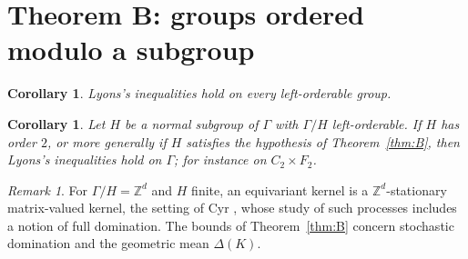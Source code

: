\documentclass[11pt]{amsart}
\newtheorem{corollary}[proposition]{Corollary}
\theoremstyle{remark}
\newtheorem{remark}[proposition]{Remark}
\theoremstyle{definition}
\newcommand{\Ga}{\Gamma}
\newcommand{\FK}{\Delta}
\begin{document}
\section{Theorem B: groups ordered modulo a subgroup}\label{sec:B}

\begin{corollary}\label{cor:lo}
Lyons's inequalities hold on every left-orderable group.
\end{corollary}

\begin{corollary}\label{cor:finite}
Let $H$ be a normal subgroup of $\Ga$ with $\Ga/H$ left-orderable. If $H$ has order $2$, or more generally if $H$
satisfies the hypothesis of Theorem~\ref{thm:B}, then Lyons's inequalities hold on $\Ga$; for instance on $C_2\times F_2$.
\end{corollary}

\begin{remark}
For $\Ga/H=\mathbb Z^d$ and $H$ finite, an equivariant kernel is a $\mathbb Z^d$-stationary matrix-valued kernel, the
setting of Cyr \cite{Cyr21}, whose study of such processes includes a notion of full domination. The bounds of
Theorem~\ref{thm:B} concern stochastic domination and the geometric mean $\FK(K)$.
\end{remark}
\end{document}
